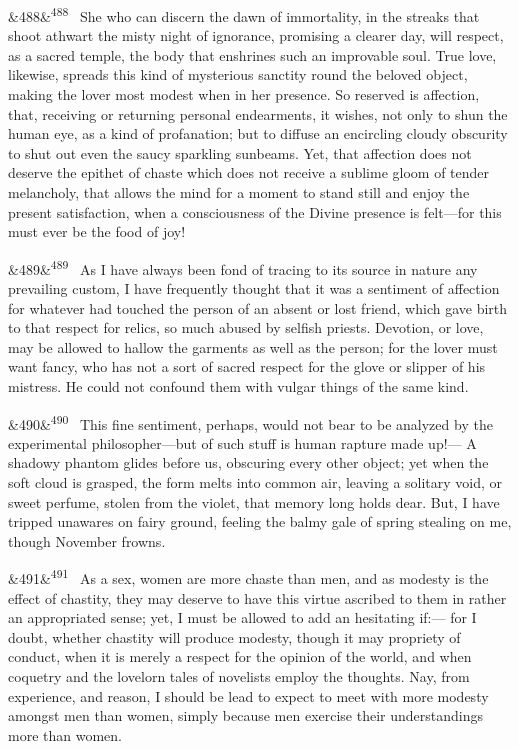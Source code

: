 \documentclass[12pt]{article}
\newcommand{\para}[1][]{\par\noindent\ifx&#1&\else\textsuperscript{\footnotesize #1}~\fi}
\begin{document}
\para[488] She who can discern the dawn of immortality, in the streaks that shoot athwart the misty night of ignorance, promising a clearer day, will respect, as a sacred temple, the body that enshrines such an improvable soul. True love, likewise, spreads this kind of mysterious sanctity round the beloved object, making the lover most modest when in her presence. So reserved is affection, that, receiving or returning personal endearments, it wishes, not only to shun the human eye, as a kind of profanation; but to diffuse an encircling cloudy obscurity to shut out even the saucy sparkling sunbeams. Yet, that affection does not deserve the epithet of chaste which does not receive a sublime gloom of tender melancholy, that allows the mind for a moment to stand still and enjoy the present satisfaction, when a consciousness of the Divine presence is felt---for this must ever be the food of joy!

\para[489] As I have always been fond of tracing to its source in nature any prevailing custom, I have frequently thought that it was a sentiment of affection for whatever had touched the person of an absent or lost friend, which gave birth to that respect for relics, so much abused by selfish priests. Devotion, or love, may be allowed to hallow the garments as well as the person; for the lover must want fancy, who has not a sort of sacred respect for the glove or slipper of his mistress. He could not confound them with vulgar things of the same kind.

\para[490] This fine sentiment, perhaps, would not bear to be analyzed by the experimental philosopher---but of such stuff is human rapture made up!--- A shadowy phantom glides before us, obscuring every other object; yet when the soft cloud is grasped, the form melts into common air, leaving a solitary void, or sweet perfume, stolen from the violet, that memory long holds dear. But, I have tripped unawares on fairy ground, feeling the balmy gale of spring stealing on me, though November frowns.

\para[491] As a sex, women are more chaste than men, and as modesty is the effect of chastity, they may deserve to have this virtue ascribed to them in rather an appropriated sense; yet, I must be allowed to add an hesitating if:--- for I doubt, whether chastity will produce modesty, though it may propriety of conduct, when it is merely a respect for the opinion of the world, and when coquetry and the lovelorn tales of novelists employ the thoughts. Nay, from experience, and reason, I should be lead to expect to meet with more modesty amongst men than women, simply because men exercise their understandings more than women.
\end{document}
